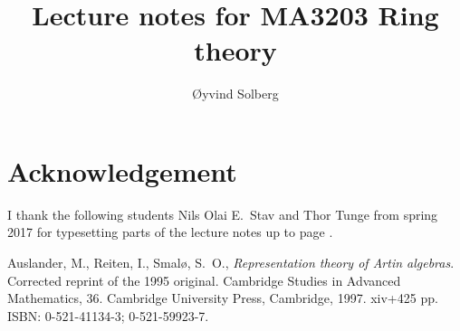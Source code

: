 \documentclass{amsart}
\numberwithin{equation}{section}
\theoremstyle{definition}
\begin{document}
\title{Lecture notes for MA3203 Ring theory}

\author{\O yvind Solberg}
\address{Department of Mathematical Sciences\\
NTNU\\
N-7491 Trondheim, Norway}

\maketitle
\tableofcontents

\section*{Acknowledgement}
I thank the following students Nils Olai E.\ Stav and Thor Tunge from
spring 2017 for typesetting parts of the lecture notes up to page
\pageref{2017-pages}.






	



\printindex
\begin{thebibliography}{ARS}
 Auslander, M., Reiten, I., Smal\o, S.\ O.,
  \emph{Representation theory of Artin algebras}. Corrected reprint of
  the 1995 original. Cambridge Studies in Advanced Mathematics,
  36. Cambridge University Press, Cambridge, 1997. xiv+425 pp. ISBN:
  0-521-41134-3; 0-521-59923-7.
\end{thebibliography}
\end{document}
